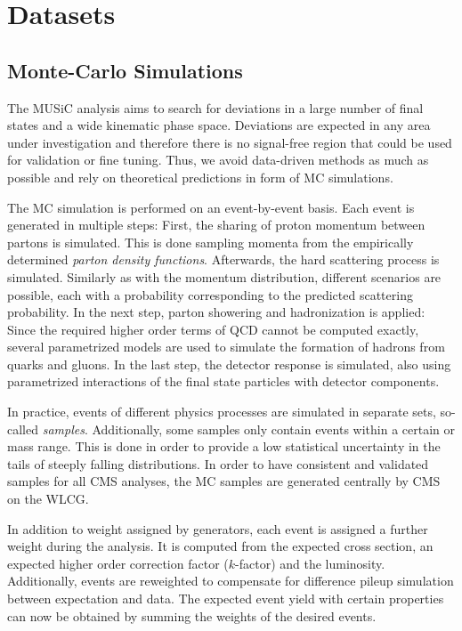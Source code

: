 
\chapter{Datasets}
\section{Monte-Carlo Simulations}
The \ac{MUSiC} analysis aims to search for deviations in a large number of final states and a wide kinematic phase space. Deviations are expected in any area under investigation and therefore there is no signal-free region that could be used for validation or fine tuning. Thus, we avoid data-driven methods as much as possible and rely on theoretical predictions in form of \acl{MC} simulations.

The \acl{MC} simulation is performed on an event-by-event basis. Each event is generated in multiple steps\cite{Webber:PartonshowerMonte}: First, the sharing of proton momentum between partons is simulated. This is done sampling momenta from the empirically determined \emph{parton density functions}.
Afterwards, the hard scattering process is simulated. Similarly as with the momentum distribution, different scenarios are possible, each with a probability corresponding to the predicted scattering probability. In the next step, parton showering and hadronization is applied: Since the required higher order terms of \ac{QCD} cannot be computed exactly, several parametrized models are used to simulate the formation of hadrons from quarks and gluons. In the last step, the detector response is simulated, also using parametrized interactions of the final state particles with detector components.

In practice, events of different physics processes are simulated in separate sets, so-called \emph{samples}. 
Additionally, some samples only contain events within a certain \pT or mass range. This is done in order to provide a low statistical uncertainty in the tails of steeply falling distributions.
In order to have consistent and validated samples for all \ac{CMS} analyses, the \ac{MC} samples are generated centrally by \ac{CMS} on the \ac{WLCG}\cite{TWiki:GeneratorValidation}.

In addition to weight assigned by generators, each event is assigned a further weight during the analysis. It is computed from the expected cross section, an expected higher order correction factor ($k$-factor) and the luminosity. 
Additionally, events are reweighted to compensate for difference pileup simulation between expectation and data. 
The expected event yield with certain properties can now be obtained by summing the weights of the desired events.

